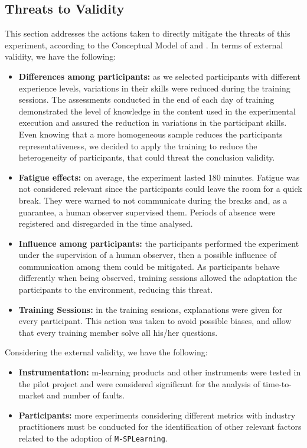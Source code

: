\subsection{Threats to Validity}\label{sec:threats}

This section addresses the actions taken to directly mitigate the threats of this experiment, according to the Conceptual Model of \cite{neto13} and \cite{wohlin12}. In terms of external validity, we have the following:

\begin{itemize}
\item \textbf{Differences among participants:} as we selected participants with different experience levels, variations in their skills were reduced during the training sessions. The assessments conducted in the end of each day of training demonstrated the level of knowledge in the content used in the experimental execution and assured the reduction in variations in the participant skills. Even knowing that a more homogeneous sample reduces the participants representativeness, we decided to apply the training to reduce the heterogeneity of participants, that could threat the conclusion validity.

\item \textbf{Fatigue effects:} on average, the experiment lasted 180 minutes. Fatigue was not considered relevant since the participants could leave the room for a quick break. They were warned to not communicate during the breaks and, as a guarantee, a human observer supervised them. Periods of absence were registered and disregarded in the time analysed.

\item \textbf{Influence among participants:} the participants performed the experiment under the supervision of a human observer, then a possible influence of communication among them could be mitigated. As participants behave differently when being observed, training sessions allowed the adaptation the participants to the environment, reducing this threat.

\item \textbf{Training Sessions:} in the training sessions, explanations were given for every participant. This action was taken to avoid possible biases, and allow that every training member solve all his/her questions.
\end{itemize}

Considering the external validity, we have the following:

\begin{itemize}

\item \textbf{Instrumentation:} m-learning products and other instruments were tested in the pilot project and were considered significant for the analysis of time-to-market and number of faults.

\item \textbf{Participants:} more experiments considering different metrics with industry practitioners must be conducted for the identification of other relevant factors related to the adoption of \texttt{M-SPLear\allowbreak ning}.

\end{itemize}


